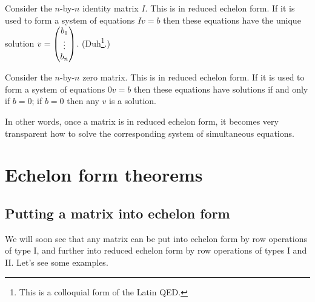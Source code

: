 \documentclass{article}
\begin{document}
\begin{Example}
Consider the \(n\)-by-\(n\) identity matrix \(I\). This is in
reduced echelon form. If it is used to form a system of equations
\(Iv=b\) then these equations have the unique solution \(v=\begin{pmatrix}
b_1\\ \vdots\\ b_n\end{pmatrix}\). (Duh\footnote{This is a colloquial form of
the Latin QED.}.)


\end{Example}
\begin{Example}
Consider the \(n\)-by-\(n\) zero matrix. This is in reduced echelon
form. If it is used to form a system of equations \(0v=b\) then
these equations have solutions if and only if \(b=0\); if \(b=0\)
then any \(v\) is a solution.


\end{Example}
In other words, once a matrix is in reduced echelon form, it becomes
very transparent how to solve the corresponding system of simultaneous
equations.


\clearpage
\section{Echelon form theorems}
\subsection{Putting a matrix into echelon form}


We will soon see that any matrix can be put into echelon form by row
operations of type I, and further into reduced echelon form by row
operations of types I and II. Let's see some examples.
\end{document}
